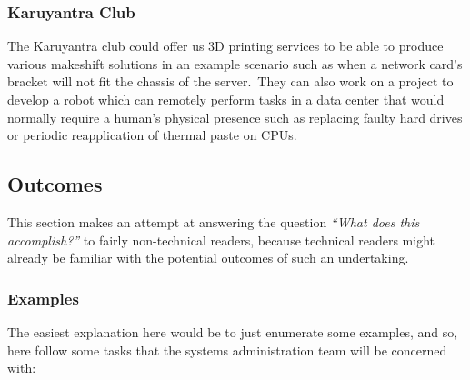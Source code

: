 \documentclass[11pt,twocolumn,oneside]{book}
\begin{document}
    \subsubsection{Karuyantra Club}
    The Karuyantra club could offer us 3D printing services to be able to produce various makeshift solutions in an
    example scenario such as when a network card's bracket will not fit the chassis of the server.\ They can also
    work on a project to develop a robot which can remotely perform tasks in a data center that would normally require a
    human's physical presence such as replacing faulty hard drives or periodic reapplication of thermal paste on CPUs.

    \subsection{Outcomes}\label{subsec:outcomes}
    This section makes an attempt at answering the question \emph{``What does this accomplish?''} to fairly non-technical
    readers, because technical readers might already be familiar with the potential outcomes of such an undertaking.

    \subsubsection{Examples}
    The easiest explanation here would be to just enumerate some examples, and so, here follow some tasks that the
    systems administration team will be concerned with:
\end{document}
